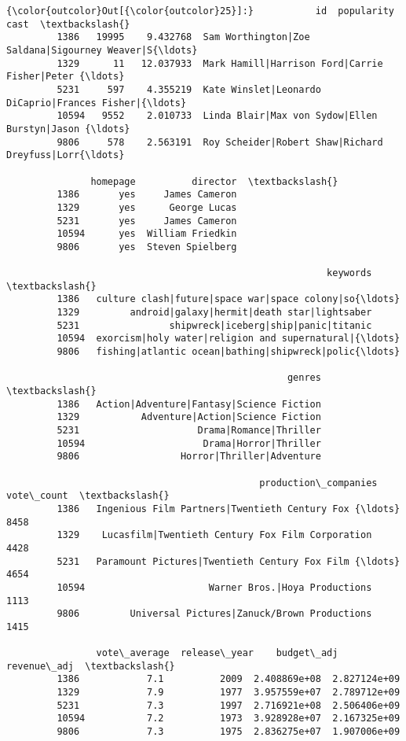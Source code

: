 \documentclass[11pt]{article}
\begin{document}
\begin{Verbatim}[commandchars=\\\{\}]
{\color{outcolor}Out[{\color{outcolor}25}]:}           id  popularity                                               cast  \textbackslash{}
         1386   19995    9.432768  Sam Worthington|Zoe Saldana|Sigourney Weaver|S{\ldots}   
         1329      11   12.037933  Mark Hamill|Harrison Ford|Carrie Fisher|Peter {\ldots}   
         5231     597    4.355219  Kate Winslet|Leonardo DiCaprio|Frances Fisher|{\ldots}   
         10594   9552    2.010733  Linda Blair|Max von Sydow|Ellen Burstyn|Jason {\ldots}   
         9806     578    2.563191  Roy Scheider|Robert Shaw|Richard Dreyfuss|Lorr{\ldots}   
         
               homepage          director  \textbackslash{}
         1386       yes     James Cameron   
         1329       yes      George Lucas   
         5231       yes     James Cameron   
         10594      yes  William Friedkin   
         9806       yes  Steven Spielberg   
         
                                                         keywords  \textbackslash{}
         1386   culture clash|future|space war|space colony|so{\ldots}   
         1329         android|galaxy|hermit|death star|lightsaber   
         5231                shipwreck|iceberg|ship|panic|titanic   
         10594  exorcism|holy water|religion and supernatural|{\ldots}   
         9806   fishing|atlantic ocean|bathing|shipwreck|polic{\ldots}   
         
                                                  genres  \textbackslash{}
         1386   Action|Adventure|Fantasy|Science Fiction   
         1329           Adventure|Action|Science Fiction   
         5231                     Drama|Romance|Thriller   
         10594                     Drama|Horror|Thriller   
         9806                  Horror|Thriller|Adventure   
         
                                             production\_companies  vote\_count  \textbackslash{}
         1386   Ingenious Film Partners|Twentieth Century Fox {\ldots}        8458   
         1329    Lucasfilm|Twentieth Century Fox Film Corporation        4428   
         5231   Paramount Pictures|Twentieth Century Fox Film {\ldots}        4654   
         10594                      Warner Bros.|Hoya Productions        1113   
         9806         Universal Pictures|Zanuck/Brown Productions        1415   
         
                vote\_average  release\_year    budget\_adj   revenue\_adj  \textbackslash{}
         1386            7.1          2009  2.408869e+08  2.827124e+09   
         1329            7.9          1977  3.957559e+07  2.789712e+09   
         5231            7.3          1997  2.716921e+08  2.506406e+09   
         10594           7.2          1973  3.928928e+07  2.167325e+09   
         9806            7.3          1975  2.836275e+07  1.907006e+09   
         

\end{Verbatim}
\end{document}
